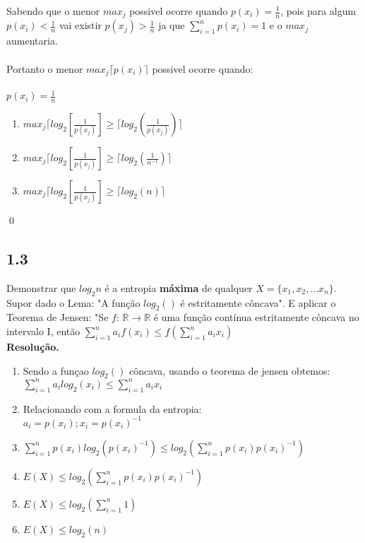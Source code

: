 \documentclass[12pt,letterpaper]{article}
\newcommand\answer{\textbf{Resolução.}\xspace}
\begin{document}
Sabendo que o menor $max_j$ possivel ocorre quando $p(x_i) = \frac{1}{n}$, pois para algum $p(x_i) < \frac{1}{n}$ vai existir $p(x_j) > \frac{1}{n}$ ja que $\sum_{i=1}^n p(x_i)= 1$ e o $max_j$ aumentaria.\\ \\

Portanto o menor $max_j \lceil p(x_i) \rceil$ possivel ocorre quando:\\ \\
$p(x_i) = \frac{1}{n}$

\begin{enumerate}
    \item $max_j \lceil log_2[\frac{1}{p(x_j)}] \geq \lceil log_2(\frac{1}{p(x_j)}) \rceil$
    \item $max_j \lceil log_2[\frac{1}{p(x_j)}] \geq \lceil log_2(\frac{1}{n^{-1}}) \rceil$
    \item $max_j \lceil log_2[\frac{1}{p(x_j)}] \geq \lceil log_2(n) \rceil$
\end{enumerate}

\qed

\subsection*{1.3}
Demonstrar que $log_2n$ é a entropia \textbf{máxima} de qualquer $X=\{x_1,x_2,...x_n\}$.\\ 
Supor dado o Lema: "A função $log_2()$ é estritamente côncava". E aplicar o Teorema de Jensen: "Se $f$: $\mathbb{R} \rightarrow \mathbb{R}$ é uma função contínua estritamente côncava no intervalo I, então $\sum_{i=1}^n a_i f (x_i) \leq  f ( \sum_{i=1}^n a_i x_i )$
\\
\answer

\begin{enumerate}
    \item Sendo a funçao $log_2()$ côncava, usando o teorema de jensen obtemos:
        \\ $\sum_{i=1}^n a_i log_2(x_i) \leq \sum_{i=1}^n a_i x_i$
    \item Relacionando com a formula da entropia:
        \\ $ a_i = p(x_i); x_i = p(x_i)^{-1}$
    \item $\sum_{i=1}^n p(x_i)log_2(p(x_i)^{-1}) \leq log_2(\sum_{i=1}^n p(x_i)p(x_i)^{-1})$
    \item $E(X) \leq log_2(\sum_{i=1}^n p(x_i)p(x_i)^{-1})$
    \item $E(X) \leq log_2(\sum_{i=1}^n 1)$
    \item $E(X) \leq log_2(n)$
\end{enumerate}
\end{document}

